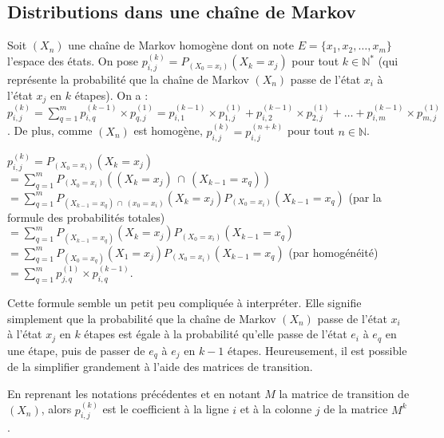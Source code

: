 	\subsection{Distributions dans une chaîne de Markov}
	
	\begin{formula}[Proposition]
		Soit $(X_n)$ une chaîne de Markov homogène dont on note $E = \{x_1, x_2, \dots, x_m\}$ l'espace des états. On pose $p_{i,j}^{(k)} = P_{(X_0 = x_i)}(X_k = x_j)$ pour tout $k \in \mathbb{N}^*$ (qui représente la probabilité que la chaîne de Markov $(X_n)$ passe de l'état $x_i$ à l'état $x_j$ en $k$ étapes). On a :
		\newpar
		$\displaystyle{p_{i,j}^{(k)} = \sum_{q=1}^m p_{i,q}^{(k-1)} \times p_{q,j}^{(1)} = p_{i,1}^{(k-1)} \times p_{1,j}^{(1)} + p_{i,2}^{(k-1)} \times p_{2,j}^{(1)} + \dots + p_{i,m}^{(k-1)} \times p_{m,j}^{(1)}}$.
		\newpar
		De plus, comme $(X_n)$ est homogène, $p_{i,j}^{(k)} = p_{i,j}^{(n+k)}$ pour tout $n \in \mathbb{N}$.
	\end{formula}
	
	\begin{demonstration}[Proposition]
		$\displaystyle{p_{i,j}^{(k)} = P_{(X_0 = x_i)}(X_k = x_j)}$
		\newline
		$\displaystyle{= \sum_{q=1}^m P_{(X_0 = x_i)}((X_k = x_j) \, \cap \, (X_{k-1} = x_q))}$
		\newline
		$\displaystyle{= \sum_{q=1}^m P_{(X_{k-1} = x_q) \, \cap \, (x_0 = x_i)}(X_k = x_j) P_{(X_0 = x_i)}(X_{k-1} = x_q)}$ (par la formule des probabilités totales)
		\newline
		$\displaystyle{= \sum_{q=1}^m P_{(X_{k-1} = x_q)}(X_k = x_j) P_{(X_0 = x_i)}(X_{k-1} = x_q)}$
		\newline
		$\displaystyle{= \sum_{q=1}^m P_{(X_0 = x_q)}(X_1 = x_j) P_{(X_0 = x_i)}(X_{k-1} = x_q)}$ (par homogénéité)
		\newline
		$\displaystyle{= \sum_{q=1}^m p_{j,q}^{(1)} \times p_{i,q}^{(k-1)}}$.
	\end{demonstration}
	
	Cette formule semble un petit peu compliquée à interpréter. Elle signifie simplement que la probabilité que la chaîne de Markov $(X_n)$ passe de l'état $x_i$ à l'état $x_j$ en $k$ étapes est égale à la probabilité qu'elle passe de l'état $e_i$ à $e_q$ en une étape, puis de passer de $e_q$ à $e_j$ en $k-1$ étapes. Heureusement, il est possible de la simplifier grandement à l'aide des matrices de transition.
	
	\begin{formula}
		En reprenant les notations précédentes et en notant $M$ la matrice de transition de $(X_n)$, alors $p_{i,j}^{(k)}$ est le coefficient à la ligne $i$ et à la colonne $j$ de la matrice $M^k$.
	\end{formula}
	
